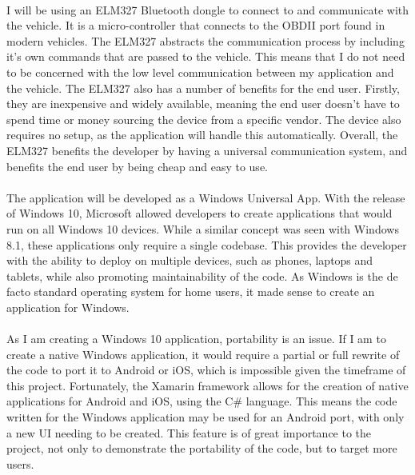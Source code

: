 \documentclass[12pt]{report}
\begin{document}
			\paragraph{}{
			I will be using an ELM327 Bluetooth dongle to connect to and communicate with the vehicle. It is a micro-controller that connects to the OBDII port found in modern vehicles. The ELM327 abstracts the communication process by including it's own commands that are passed to the vehicle. This means that I do not need to be concerned with the low level communication between my application and the vehicle.	The ELM327 also has a number of benefits for the end user. Firstly, they are inexpensive and widely available, meaning the end user doesn't have to spend time or money sourcing the device from a specific vendor. The device also requires no setup, as the application will handle this automatically. Overall, the ELM327 benefits the developer by having a universal communication system, and benefits the end user by being cheap and easy to use.
			}
			\paragraph{}{
			The application will be developed as a Windows Universal App. With the release of Windows 10, Microsoft allowed developers to create applications that would run on all Windows 10 devices. While a similar concept was seen with Windows 8.1, these applications only require a single codebase. This provides the developer with the ability to deploy on multiple devices, such as phones, laptops and tablets, while also promoting maintainability of the code. As Windows is the de facto standard operating system for home users, it made sense to create an application for Windows.
			}
			\paragraph{}{
			As I am creating a Windows 10 application, portability is an issue. If I am to create a native Windows application, it would require a partial or full rewrite of the code to port it to Android or iOS, which is impossible given the timeframe of this project. Fortunately, the Xamarin framework allows for the creation of native applications for Android and iOS, using the C{\#} language. This means the code written for the Windows application may be used for an Android port, with only a new UI needing to be created. This feature is of great importance to the project, not only to demonstrate the portability of the code, but to target more users.
			}
		\newpage
\end{document}
